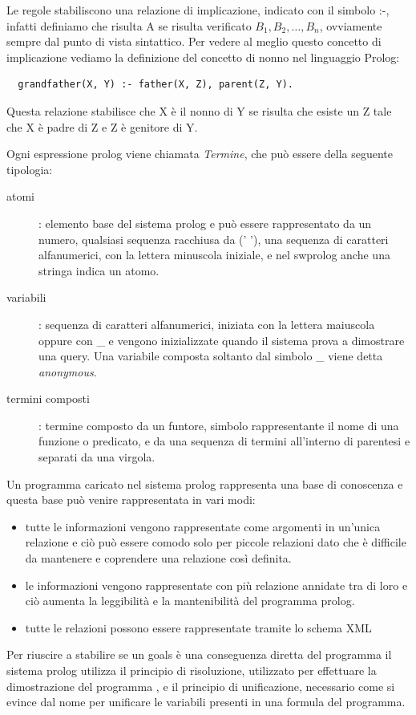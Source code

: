 \documentclass[a4paper]{report}
\begin{document}
Le regole stabiliscono una relazione di implicazione, indicato con il simbolo :-, infatti definiamo che risulta A se risulta verificato
$B_1, B_2, \dots, B_n$, ovviamente sempre dal punto di vista sintattico.
Per vedere al meglio questo concetto di implicazione vediamo la definizione del concetto di nonno nel linguaggio Prolog:
\begin{verbatim}
  grandfather(X, Y) :- father(X, Z), parent(Z, Y).
\end{verbatim}
Questa relazione stabilisce che X è il nonno di Y se risulta che esiste un Z tale che X è padre di Z e Z è genitore di Y.

Ogni espressione prolog viene chiamata \emph{Termine}, che può essere della seguente tipologia:
\begin{description}
\item [atomi] : elemento base del sistema prolog e può essere rappresentato da un numero, qualsiasi sequenza racchiusa da (' '),
  una sequenza di caratteri alfanumerici, con la lettera minuscola iniziale, e nel swprolog anche una stringa indica un atomo.

\item [variabili] : sequenza di caratteri alfanumerici, iniziata con la lettera maiuscola oppure con \_ e vengono inizializzate
  quando il sistema prova a dimostrare una query.\newline
                    Una variabile composta soltanto dal simbolo \_ viene detta \emph{anonymous}.

\item [termini composti]: termine composto da un funtore, simbolo rappresentante il nome di una funzione o predicato, e da una sequenza
                          di termini all'interno di parentesi e separati da una virgola.                    
\end{description}

Un programma caricato nel sistema prolog rappresenta una base di conoscenza e questa base può venire rappresentata in vari modi:
\begin{itemize}
\item tutte le informazioni vengono rappresentate come argomenti in un'unica relazione e ciò può essere comodo solo per
  piccole relazioni dato che è difficile da mantenere e coprendere una relazione così definita.
\item le informazioni vengono rappresentate con più relazione annidate tra di loro e ciò aumenta la leggibilità e
  la mantenibilità del programma prolog.
\item tutte le relazioni possono essere rappresentate tramite lo schema XML
\end{itemize}
Per riuscire a stabilire se un goals è una conseguenza diretta del programma il sistema prolog utilizza il principio di risoluzione,
utilizzato per effettuare la dimostrazione del programma , e il principio di unificazione, necessario come si evince dal nome per
unificare le variabili presenti in una formula del programma.
\end{document}
